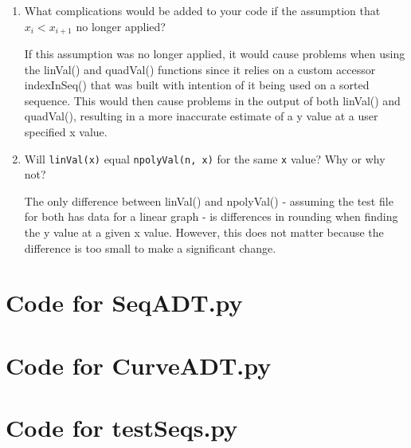 \documentclass[12pt]{article}
\begin{document}
\begin{enumerate}
\item What complications would be added to your code if the assumption that
  $x_i < x_{i+1}$ no longer applied?

If this assumption was no longer applied, it would cause problems when using the linVal() and quadVal() functions since it relies on a custom accessor indexInSeq() that was built with intention of it being used on a sorted sequence. This would then cause problems in the output of both linVal() and quadVal(), resulting in a more inaccurate estimate of a y value at a user specified x value.

\item Will \texttt{linVal(x)} equal \texttt{npolyVal(n, x)} for the same \texttt{x}
  value?  Why or why not?

The only difference between linVal() and npolyVal() - assuming the test file for both has data for a linear graph - is differences in rounding when finding the y value at a given x value. However, this does not matter because the difference is too small to make a significant change. 
\end{enumerate}

\newpage

\lstset{language=Python, basicstyle=\tiny, breaklines=true, showspaces=false,
  showstringspaces=false, breakatwhitespace=true}

\def\thesection{\Alph{section}} 

\section{Code for SeqADT.py}

\noindent 

\newpage

\section{Code for CurveADT.py}

\noindent 

\newpage

\section{Code for testSeqs.py}

\noindent 
\end{document}
